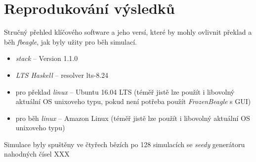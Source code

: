\section{Reprodukování výsledků}
\label{sec:reproducing}

Stručný přehled klíčového software a jeho versí, které by mohly ovlivnit překlad a běh \textit{fbeagle}, jak byly užity pro běh simulací.

\begin{itemize}
  \item \textit{stack} -- Version 1.1.0
  \item \textit{LTS Haskell} -- resolver lts-8.24
  \item pro překlad \textit{linux} -- Ubuntu 16.04 LTS (téměř jistě lze použít i libovolný aktuální OS unixoveho typu, pokud není potřeba použít \textit{FrozenBeagle} s GUI)
  \item pro běh \textit{linux} -- Amazon Linux (téměř jistě lze použít i libovolný aktuální OS unixoveho typu)
\end{itemize}

Simulace byly spuštěny ve čtyřech bězích po 128 simulacích se \textit{seedy} generátoru nahodných čísel XXX
